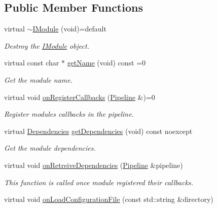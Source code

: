 \subsection*{Public Member Functions}
\begin{DoxyCompactItemize}
\item 
virtual \mbox{\hyperlink{classo_z_1_1_i_module_a6ac6f3edf9fe885b2510dc01379a951c}{$\sim$\+I\+Module}} (void)=default
\begin{DoxyCompactList}\small\item\em Destroy the \mbox{\hyperlink{classo_z_1_1_i_module}{I\+Module}} object. \end{DoxyCompactList}\item 
virtual const char $\ast$ \mbox{\hyperlink{classo_z_1_1_i_module_af41d45158fd28e1bd86a34e25f5282d6}{get\+Name}} (void) const =0
\begin{DoxyCompactList}\small\item\em Get the module name. \end{DoxyCompactList}\item 
virtual void \mbox{\hyperlink{classo_z_1_1_i_module_a3dc905faa6df5e22eecc6ffbc923fd95}{on\+Register\+Callbacks}} (\mbox{\hyperlink{classo_z_1_1_pipeline}{Pipeline}} \&)=0
\begin{DoxyCompactList}\small\item\em Register module\textquotesingle{}s callbacks in the pipeline. \end{DoxyCompactList}\item 
virtual \mbox{\hyperlink{classo_z_1_1_i_module_ac13210556cb2a65d186bfbe5208c666c}{Dependencies}} \mbox{\hyperlink{classo_z_1_1_i_module_a720a329e6ebcbecbc150d8b0bbee6e37}{get\+Dependencies}} (void) const noexcept
\begin{DoxyCompactList}\small\item\em Get the module dependencies. \end{DoxyCompactList}\item 
virtual void \mbox{\hyperlink{classo_z_1_1_i_module_af183d3711ef7d7a6966ac078b63a7685}{on\+Retreive\+Dependencies}} (\mbox{\hyperlink{classo_z_1_1_pipeline}{Pipeline}} \&pipeline)
\begin{DoxyCompactList}\small\item\em This function is called once module registered their callbacks. \end{DoxyCompactList}\item 
virtual void \mbox{\hyperlink{classo_z_1_1_i_module_a61a2cc76594401ed2f50931a6a6b76f3}{on\+Load\+Configuration\+File}} (const std\+::string \&directory)

\end{DoxyCompactItemize}
